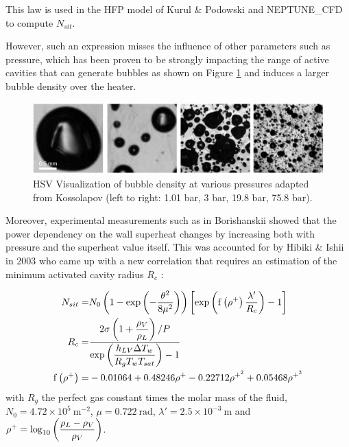 \begin{remark*}{}
This law is used in the HFP model of Kurul \& Podowski and NEPTUNE\_CFD to compute $N_{sit}$.
\end{remark*}

However, such an expression misses the influence of other parameters such as pressure, which has been proven to be strongly impacting the range of active cavities that can generate bubbles as shown on Figure \ref{fig:nsd_P_koss} and induces a larger bubble density over the heater. 

\begin{figure}[h!]
\centering
\includegraphics[width=0.7\linewidth]{img/NSD/nsd_press_koss.png}
\caption{HSV Visualization of bubble density at various pressures adapted from Kossolapov \cite{kossolapov_experimental_2021} (left to right: 1.01 bar, 3 bar, 19.8 bar, 75.8 bar). }
\label{fig:nsd_P_koss}
\end{figure}

\npar

Moreover, experimental measurements such as in Borishanskii \cite{borishanskii} showed that the power dependency on the wall superheat changes by increasing both with pressure and the superheat value itself. This was accounted for by Hibiki \& Ishii in 2003 \cite{hibiki_ishii} who came up with a new correlation that requires an estimation of the minimum activated cavity radius $R_{c}$ : 


\begin{align}
N_{sit} =& N_{0}\parth{1-\exp{-\dfrac{\theta^{2}}{8\mu^{2}} } }\crocht{\exp{ \mathrm{f}\parth{\rho^{+}}\dfrac{\lambda '}{R_{c}} } -1}
\label{eq:nsit_hibiki} \\
%
R_{c} =& \dfrac{2\sigma\parth{1+\dfrac{\rho_{V}}{\rho_{L}}} / P }{\exp{\dfrac{h_{LV} \Delta T_{w}}{R_{g}T_{w}T_{sat}} } -1}\\
%
\mathrm{f}\parth{\rho^{+}} =& -0.01064 + 0.48246\rho^{+} - 0.22712 \rho^{+^{2}} + 0.05468 \rho^{+^{3}}
\end{align}
with $R_{g}$ the perfect gas constant times the molar mass of the fluid,  $N_{0}=4.72\times 10^{5}\ \mathrm{m}^{-2}$, $\mu = 0.722\ \mathrm{rad}$, $\lambda ' = 2.5 \times 10^{-3} \ \mathrm{m}$ and $\rho^{+}=\mathrm{log}_{10}\left( \dfrac{\rho_{L}-\rho_{V}}{\rho_{V}} \right)$.


